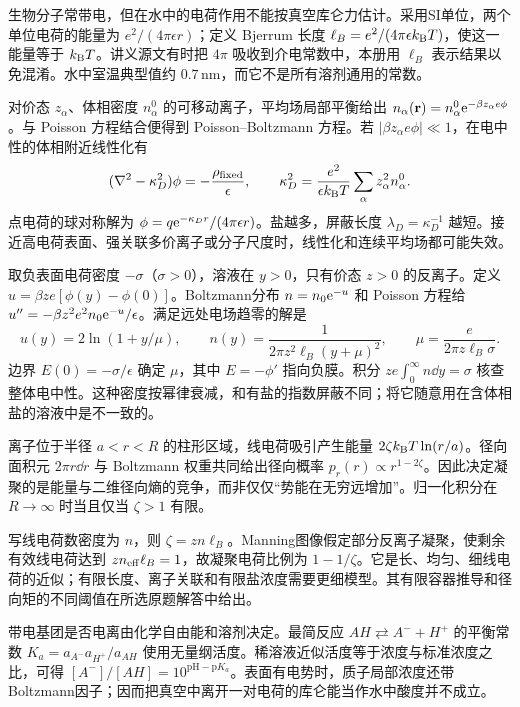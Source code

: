 生物分子常带电，但在水中的电荷作用不能按真空库仑力估计。采用SI单位，两个单位电荷的能量为 $e^2/(4\pi\epsilon r)$；定义 Bjerrum 长度 $\ell_B=e^2/(4\pi\epsilon k_{\mathrm B} T)$，使这一能量等于 $k_{\mathrm B} T$。讲义源文有时把 $4\pi$ 吸收到介电常数中，本册用 $\ell_B$ 表示结果以免混淆。水中室温典型值约 $0.7\,\mathrm{nm}$，而它不是所有溶剂通用的常数。

对价态 $z_\alpha$、体相密度 $n_\alpha^0$ 的可移动离子，平均场局部平衡给出 $n_\alpha(\mathbf r)=n_\alpha^0\mathrm e^{-\beta z_\alpha e\phi}$。与 Poisson 方程结合便得到 Poisson--Boltzmann 方程。若 $|\beta z_\alpha e\phi|\ll1$，在电中性的体相附近线性化有
\[
(\nabla^2-\kappa_D^2)\phi=-\frac{\rho_{\rm fixed}}\epsilon,
\qquad \kappa_D^2=\frac{e^2}{\epsilon k_{\mathrm B} T}\sum_\alpha z_\alpha^2n_\alpha^0.
\]
点电荷的球对称解为 $\phi=q\mathrm e^{-\kappa_D r}/(4\pi\epsilon r)$。盐越多，屏蔽长度 $\lambda_D=\kappa_D^{-1}$ 越短。接近高电荷表面、强关联多价离子或分子尺度时，线性化和连续平均场都可能失效。

取负表面电荷密度 $-\sigma$（$\sigma>0$），溶液在 $y>0$，只有价态 $z>0$ 的反离子。定义 $u=\beta ze[\phi(y)-\phi(0)]$。Boltzmann分布 $n=n_0\mathrm e^{-u}$ 和 Poisson 方程给 $u''=-\beta z^2e^2 n_0\mathrm e^{-u}/\epsilon$。满足远处电场趋零的解是
\[
u(y)=2\ln(1+y/\mu),\qquad
n(y)=\frac1{2\pi z^2\ell_B(y+\mu)^2},\qquad
\mu=\frac{e}{2\pi z\ell_B\sigma}.
\]
边界 $E(0)=-\sigma/\epsilon$ 确定 $\mu$，其中 $E=-\phi'$ 指向负膜。积分 $ze\int_0^\infty n\dd y=\sigma$ 核查整体电中性。这种密度按幂律衰减，和有盐的指数屏蔽不同；将它随意用在含体相盐的溶液中是不一致的。

离子位于半径 $a<r<R$ 的柱形区域，线电荷吸引产生能量 $2\zeta k_{\mathrm B} T\ln(r/a)$。径向面积元 $2\pi r\dd r$ 与 Boltzmann 权重共同给出径向概率 $p_r(r)\propto r^{1-2\zeta}$。因此决定凝聚的是能量与二维径向熵的竞争，而非仅仅“势能在无穷远增加”。归一化积分在 $R\to\infty$ 时当且仅当 $\zeta>1$ 有限。

写线电荷数密度为 $n$，则 $\zeta=zn\ell_B$。Manning图像假定部分反离子凝聚，使剩余有效线电荷达到 $zn_{\rm eff}\ell_B=1$，故凝聚电荷比例为 $1-1/\zeta$。它是长、均匀、细线电荷的近似；有限长度、离子关联和有限盐浓度需要更细模型。其有限容器推导和径向矩的不同阈值在所选原题解答中给出。

带电基团是否电离由化学自由能和溶剂决定。最简反应 $AH\rightleftarrows A^-+H^+$ 的平衡常数 $K_a=a_{A^-}a_{H^+}/a_{AH}$ 使用无量纲活度。稀溶液近似活度等于浓度与标准浓度之比，可得 $[A^-]/[AH]=10^{\mathrm{pH}-\mathrm{p}K_a}$。表面有电势时，质子局部浓度还带Boltzmann因子；因而把真空中离开一对电荷的库仑能当作水中酸度并不成立。

